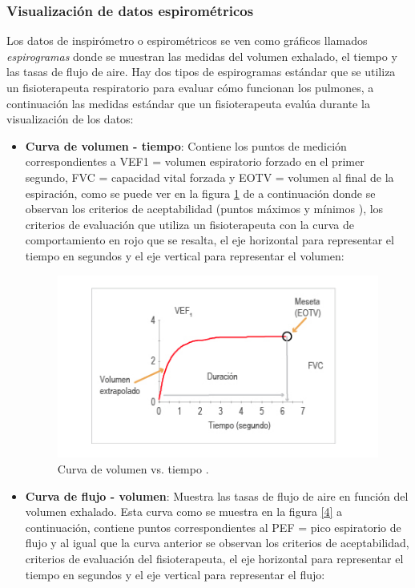 \documentclass[12pt]{article}
\begin{document}
\subsubsection{Visualización de datos espirométricos}  %

Los datos de inspirómetro o espirométricos se ven como gráficos llamados \textit{espirogramas} donde se muestran las medidas del volumen exhalado, el tiempo y las tasas de flujo de aire. Hay dos tipos de espirogramas estándar que se utiliza un fisioterapeuta respiratorio para evaluar cómo funcionan los pulmones, a continuación las medidas estándar que un fisioterapeuta evalúa durante la visualización de los datos: 

\begin{itemize}
    \item \textbf{Curva de volumen - tiempo}: Contiene los puntos de medición correspondientes a VEF1 = volumen espiratorio forzado en el primer segundo, FVC = capacidad vital forzada y EOTV = volumen al final de la espiración, como se puede ver en la figura \ref{3} de a continuación donde se observan los criterios de aceptabilidad (puntos máximos y mínimos ), los criterios de evaluación que utiliza un fisioterapeuta con la curva de comportamiento en rojo que se resalta, el eje horizontal para representar el tiempo en segundos y el eje vertical para representar el volumen:

        \begin{figure}[ht]
        \centering
        \includegraphics[scale=0.7]{imag/vvstiempo.png}
        \caption{Curva de volumen vs. tiempo \cite{36}. }
        \label{3}
        \end{figure}
        \FloatBarrier

    
    \item \textbf{Curva de flujo - volumen}: Muestra las tasas de flujo de aire en función del volumen exhalado. Esta curva como se muestra en la figura  \ref{4} a continuación,  contiene puntos correspondientes al PEF = pico espiratorio de flujo y al igual que la curva anterior se observan los criterios de aceptabilidad, criterios de evaluación del fisioterapeuta, el eje horizontal para representar el tiempo en segundos y el eje vertical para representar el flujo:
    

\end{itemize}
\end{document}
